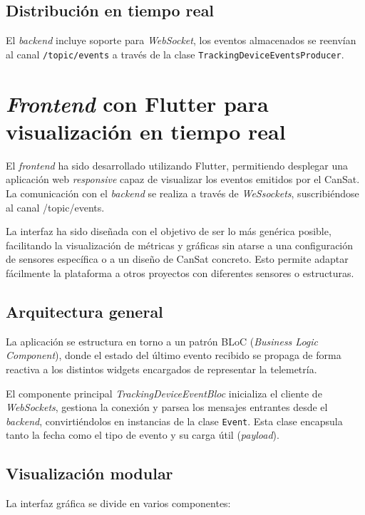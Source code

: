 \subsection{Distribución en tiempo real}

El \emph{backend} incluye soporte para \emph{WebSocket}, los eventos almacenados se reenvían al canal \texttt{/topic/events} a través de la clase \texttt{TrackingDeviceEventsProducer}.


\section{\emph{Frontend} con Flutter para visualización en tiempo real}

El \emph{frontend} ha sido desarrollado utilizando Flutter, permitiendo desplegar una aplicación web \emph{responsive} capaz de visualizar los eventos emitidos por el CanSat.
La comunicación con el \emph{backend} se realiza a través de \emph{WeSsockets}, suscribiéndose al canal /topic/events.

La interfaz ha sido diseñada con el objetivo de ser lo más genérica posible, facilitando la visualización de métricas y gráficas sin atarse a una configuración de sensores específica o a un diseño de CanSat concreto.
Esto permite adaptar fácilmente la plataforma a otros proyectos con diferentes sensores o estructuras.

\subsection{Arquitectura general}

La aplicación se estructura en torno a un patrón BLoC (\emph{Business Logic Component}), donde el estado del último evento recibido se propaga de forma reactiva a los distintos widgets encargados de representar la telemetría.

El componente principal \emph{TrackingDeviceEventBloc} inicializa el cliente de \emph{WebSockets}, gestiona la conexión y parsea los mensajes entrantes desde el \emph{backend},
convirtiéndolos en instancias de la clase \texttt{Event}.
Esta clase encapsula tanto la fecha como el tipo de evento y su carga útil (\emph{payload}).

\subsection{Visualización modular}

La interfaz gráfica se divide en varios componentes:

